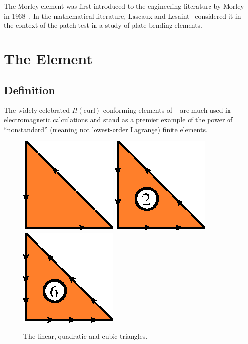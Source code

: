 The Morley element was first introduced to the engineering literature
by Morley in 1968~\cite{Morley1968}. In the mathematical literature,
Lascaux and Lesaint~\cite{LascauxLesaint1975} considered it in the
context of the patch test in a study of plate-bending elements.


\newpage

\section{The \nedelec{} Element}

\subsection{Definition}

The widely celebrated \( H(\mathrm{curl}) \)-conforming elements of
\nedelec{}~\cite{Nedelec1980,Nedelec1986} are much used in electromagnetic
calculations and stand as a premier example of the power of
``nonstandard'' (meaning not lowest-order Lagrange) finite elements.

\begin{figure}[H]
  \begin{center}
    \includegraphics[width=\elementwidth]{chapters/kirby-6/eps/NED1.eps}
    \includegraphics[width=\elementwidth]{chapters/kirby-6/eps/NED2.eps}
    \includegraphics[width=\elementwidth]{chapters/kirby-6/eps/NED3.eps}
    \caption{The linear, quadratic and cubic \nedelec{} triangles.}
  \end{center}
\end{figure}

